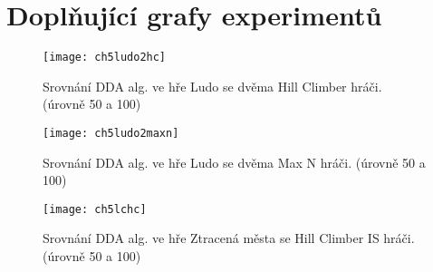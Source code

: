 \chapter{Doplňující grafy experimentů}

\begin{figure}
  \centering
  \texttt{[image: ch5ludo2hc]}
	\caption{Srovnání DDA alg. ve hře Ludo se dvěma Hill Climber hráči. (úrovně 50 a 100)}
	\label{fig-ch5ludo2hc}
\end{figure}

\begin{figure}
  \centering
  \texttt{[image: ch5ludo2maxn]}
	\caption{Srovnání DDA alg. ve hře Ludo se dvěma Max N hráči. (úrovně 50 a 100)}
	\label{fig-ch5ludo2maxn}
\end{figure}

\begin{figure}
  \centering
  \texttt{[image: ch5lchc]}
	\caption{Srovnání DDA alg. ve hře Ztracená města se Hill Climber IS hráči. (úrovně 50 a 100) }
	\label{fig-ch5lchc}
\end{figure}


\endinput
